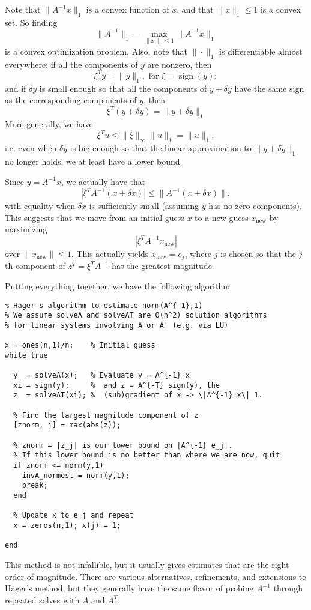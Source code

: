 \documentclass[12pt, leqno]{article} %
\begin{document}
Note that $\|A^{-1} x\|_1$ is a convex function of $x$, and that
$\|x\|_1 \leq 1$ is a convex set.  So finding
\[
  \|A^{-1}\|_1 = \max_{\|x\|_1 \leq 1} \|A^{-1} x\|_1
\]
is a convex optimization problem.  Also, note that $\|\cdot\|_1$ is
differentiable almost everywhere: if all the components of $y$ are
nonzero, then
\[
  \xi^T y = \|y\|_1, \mbox{ for } \xi = \operatorname{sign}(y);
\]
and if $\delta y$ is small enough so that all the components of $y + \delta y$
have the same sign as the corresponding components of $y$, then
\[
 \xi^T (y+\delta y) = \|y+\delta y\|_1
\]
More generally, we have
\[
  \xi^T u \leq \|\xi\|_{\infty} \|u\|_1 = \|u\|_1,
\]
i.e. even when $\delta y$ is big enough so that the linear approximation
to $\|y+\delta y\|_1$ no longer holds, we at least have a lower bound.

Since $y = A^{-1} x$, we actually have that
\[
  |\xi^T A^{-1} (x+\delta x)| \leq \|A^{-1} (x+\delta x)\|,
\]
with equality when $\delta x$ is sufficiently small (assuming $y$ has
no zero components).  This suggests that we move from an initial guess $x$
to a new guess $x_{\mathrm{new}}$ by maximizing
\[
  |\xi^T A^{-1} x_{\mathrm{new}}|
\]
over $\|x_{\mathrm{new}}\| \leq 1$.  This actually yields $x_{\mathrm{new}} = e_j$,
where $j$ is chosen so that the $j$th component of
$z^T = \xi^T A^{-1}$ has the greatest magnitude.

Putting everything together, we have the following algorithm
\begin{lstlisting}
% Hager's algorithm to estimate norm(A^{-1},1)
% We assume solveA and solveAT are O(n^2) solution algorithms
% for linear systems involving A or A' (e.g. via LU)

x = ones(n,1)/n;    % Initial guess
while true

  y  = solveA(x);   % Evaluate y = A^{-1} x
  xi = sign(y);     %  and z = A^{-T} sign(y), the
  z  = solveAT(xi); %  (sub)gradient of x -> \|A^{-1} x\|_1.

  % Find the largest magnitude component of z
  [znorm, j] = max(abs(z));

  % znorm = |z_j| is our lower bound on |A^{-1} e_j|.
  % If this lower bound is no better than where we are now, quit
  if znorm <= norm(y,1)
    invA_normest = norm(y,1);
    break;
  end

  % Update x to e_j and repeat
  x = zeros(n,1); x(j) = 1;

end
\end{lstlisting}

This method is not infallible, but it usually gives estimates that are
the right order of magnitude.  There are various alternatives,
refinements, and extensions to Hager's method, but they generally have
the same flavor of probing $A^{-1}$ through repeated solves with $A$
and $A^T$.
\end{document}
